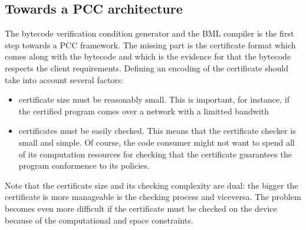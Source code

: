 \subsection{Towards a PCC architecture}

The bytecode verification condition generator and the BML compiler is the first step towards a PCC framework. 
The missing  part is  the certificate format which comes along with the bytecode and which  is the evidence for 
that the bytecode respects the client requirements. Defining an encoding of the certificate should take into account several factors:
\begin{itemize} 
  \item certificate size must be reasonably small. This is important, for instance,  if the certified program comes over a network with a limitted bandwith
  \item certificates must be easily checked. This means that the certificate checker is  small and simple.
	       Of course, the code consumer might not want to spend all of its computation 
	      resources for checking that the certificate guarantees the program conformence to its policies.     
\end{itemize}

Note that the certificate size and its checking complexity are dual: the bigger the certificate is more manageable is the checking process and viceversa. 
The problem becomes even more difficult if the certificate must be checked on the device because of the computational and space constraints.
 


  
